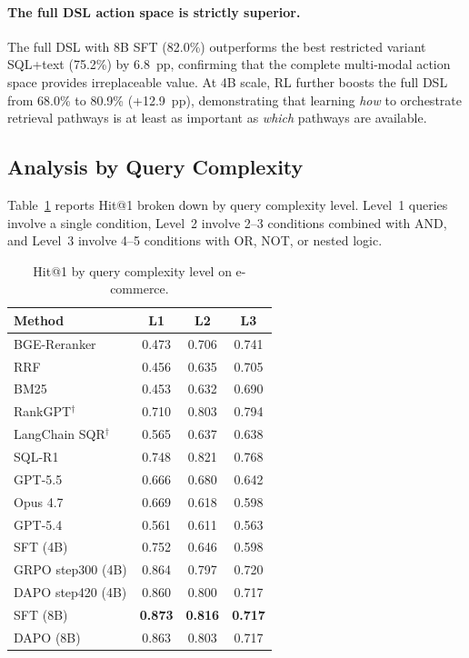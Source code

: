 \paragraph{The full DSL action space is strictly superior.}
The full DSL with 8B SFT (82.0\%) outperforms the best restricted variant SQL+text (75.2\%) by 6.8~pp, confirming that the complete multi-modal action space provides irreplaceable value. At 4B scale, RL further boosts the full DSL from 68.0\% to 80.9\% (+12.9~pp), demonstrating that learning \emph{how} to orchestrate retrieval pathways is at least as important as \emph{which} pathways are available.


\subsection{Analysis by Query Complexity}
\label{sec:complexity}

Table~\ref{tab:complexity} reports Hit@1 broken down by query complexity level. Level~1 queries involve a single condition, Level~2 involve 2--3 conditions combined with AND, and Level~3 involve 4--5 conditions with OR, NOT, or nested logic.

\begin{table}[t]
\centering
\small
\caption{Hit@1 by query complexity level on e-commerce.}
\label{tab:complexity}
\begin{tabular}{lccc}
\toprule
\textbf{Method} & \textbf{L1} & \textbf{L2} & \textbf{L3} \\
\midrule
BGE-Reranker & 0.473 & 0.706 & 0.741 \\
RRF & 0.456 & 0.635 & 0.705 \\
BM25 & 0.453 & 0.632 & 0.690 \\
\midrule
RankGPT$^\dagger$ & 0.710 & 0.803 & 0.794 \\
LangChain SQR$^\dagger$ & 0.565 & 0.637 & 0.638 \\
\midrule
SQL-R1 & 0.748 & 0.821 & 0.768 \\
\midrule
GPT-5.5 & 0.666 & 0.680 & 0.642 \\
Opus 4.7 & 0.669 & 0.618 & 0.598 \\
GPT-5.4 & 0.561 & 0.611 & 0.563 \\
\midrule
SFT (4B) & 0.752 & 0.646 & 0.598 \\
GRPO step300 (4B) & 0.864 & 0.797 & 0.720 \\
DAPO step420 (4B) & 0.860 & 0.800 & 0.717 \\
SFT (8B) & \textbf{0.873} & \textbf{0.816} & \textbf{0.717} \\
DAPO (8B) & 0.863 & 0.803 & 0.717 \\
\bottomrule
\end{tabular}
\end{table}

